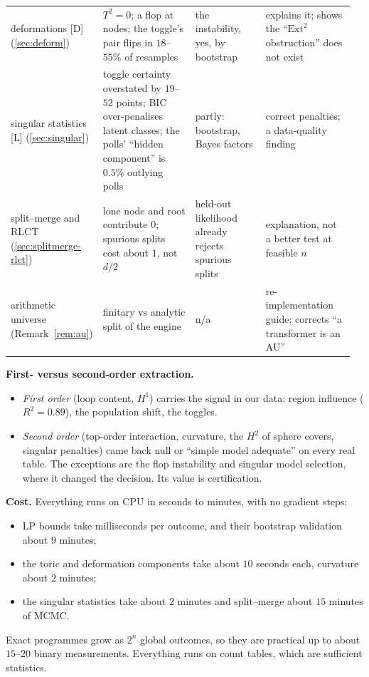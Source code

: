 \documentclass[11pt]{article}
\theoremstyle{definition}
\theoremstyle{remark}
\begin{document}
\begin{center}
{\begin{tabular}{>{\raggedright\arraybackslash}p{0.17\linewidth}>{\raggedright\arraybackslash}p{0.3\linewidth}>{\raggedright\arraybackslash}p{0.22\linewidth}>{\raggedright\arraybackslash}p{0.27\linewidth}}
deformations [D] (\ref{sec:deform}) & $T^2=0$; a flop at nodes; the toggle's pair flips in $18$--$55\%$ of resamples & the instability, yes, by bootstrap & explains it; shows the ``$\mathrm{Ext}^2$ obstruction'' does not exist\\
singular statistics [L] (\ref{sec:singular}) & toggle certainty overstated by $19$--$52$ points; BIC over-penalises latent classes; the polls' ``hidden component'' is $0.5\%$ outlying polls & partly: bootstrap, Bayes factors & correct penalties; a data-quality finding\\
split--merge and RLCT (\ref{sec:splitmerge-rlct}) & lone node and root contribute $0$; spurious splits cost about $1$, not $d/2$ & held-out likelihood already rejects spurious splits & explanation, not a better test at feasible $n$\\
arithmetic universe (Remark~\ref{rem:au}) & finitary vs analytic split of the engine & n/a & re-implementation guide; corrects ``a transformer is an AU''\\
\bottomrule
\end{tabular}}
\end{center}

\textbf{First- versus second-order extraction.}
\begin{itemize}
  \item \emph{First order} (loop content, $H^1$) carries the signal in our data: region influence ($R^2=0.89$), the population shift, the toggles.
  \item \emph{Second order} (top-order interaction, curvature, the $H^2$ of sphere covers, singular penalties) came back null or ``simple model adequate'' on every real table. The exceptions are the flop instability and singular model selection, where it changed the decision. Its value is certification.
\end{itemize}

\textbf{Cost.} Everything runs on CPU in seconds to minutes, with no gradient steps:
\begin{itemize}
  \item LP bounds take milliseconds per outcome, and their bootstrap validation about $9$ minutes;
  \item the toric and deformation components take about $10$ seconds each, curvature about $2$ minutes;
  \item the singular statistics take about $2$ minutes and split--merge about $15$ minutes of MCMC.
\end{itemize}
Exact programmes grow as $2^n$ global outcomes, so they are practical up to about $15$--$20$ binary measurements. Everything runs on count tables, which are sufficient statistics.
\end{document}
